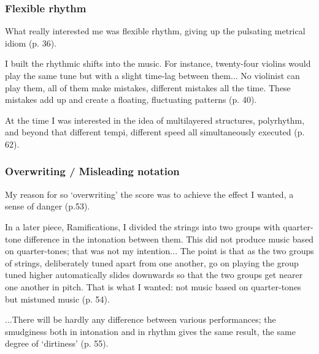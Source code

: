 \documentclass[a4paper,11pt]{article}
\newenvironment{MyShadequote}[1][]{%
    \ignorespaces%
    \begin{mdframed}[style=MyShadeQuoteStyle,#1]%
}{%
    \end{mdframed}%
    \ignorespacesafterend%
}%
\begin{document}
\subsubsection{Flexible rhythm}
\label{subs:ligeti:flexible}

\begin{MyShadequote}
  What really interested me was flexible rhythm, giving up the pulsating metrical idiom (p. 36).
\end{MyShadequote}

\begin{MyShadequote}
  I built the rhythmic shifts into the music.
  For instance, twenty-four violins would play the same tune but with a slight time-lag between them...
  No violinist can play them, all of them make mistakes, different mistakes all the time.
  These mistakes add up and create a floating, fluctuating patterns (p. 40).
\end{MyShadequote}

\begin{MyShadequote}
  At the time I was interested in the idea of multilayered structures, polyrhythm, and beyond that different tempi, different speed all simultaneously executed (p. 62).
\end{MyShadequote}

\subsubsection{Overwriting / Misleading notation}
\label{subs:ligeti:overwriting}

\begin{MyShadequote}
  My reason for so `overwriting' the score was to achieve the effect I wanted, a sense of danger (p.53).
\end{MyShadequote}

\begin{MyShadequote}
  In a later piece, Ramifications, I divided the strings into two groups with quarter-tone difference in the intonation between them.
  This did not produce music based on quarter-tones; that was not my intention...
  The point is that as the two groups of strings, deliberately tuned apart from one another, go on playing the group tuned higher automatically slides downwards so that the two groups get nearer one another in pitch.
  That is what I wanted: not music based on quarter-tones but mistuned music (p. 54).
\end{MyShadequote}

\begin{MyShadequote}
  ...There will be hardly any difference between various performances; the smudginess both in intonation and in rhythm gives the same result, the same degree of ‘dirtiness’ (p. 55).
\end{MyShadequote}
\end{document}
